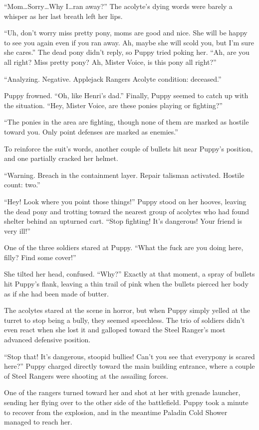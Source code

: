 ``Mom\dots Sorry\dots Why I\dots ran away?'' The acolyte's dying words were barely a whisper as her last breath left her lips.

``Uh, don't worry miss pretty pony, moms are good and nice. She will be happy to see you again even if you ran away. Ah, maybe she will scold you, but I'm sure she cares.'' The dead pony didn't reply, so Puppy tried poking her. ``Ah, are you all right? Miss pretty pony? Ah, Mister Voice, is this pony all right?''

{\mt ``Analyzing. Negative. Applejack Rangers Acolyte condition: deceased.''}

Puppy frowned. ``Oh, like Henri's dad.'' Finally, Puppy seemed to catch up with the situation. ``Hey, Mister Voice, are these ponies playing or fighting?''

{\mt ``The ponies in the area are fighting, though none of them are marked as hostile toward you. Only point defenses are marked as enemies.''}

To reinforce the suit's words, another couple of bullets hit near Puppy's position, and one partially cracked her helmet.

{\mt ``Warning. Breach in the containment layer. Repair talisman activated. Hostile count: two.''}

``Hey! Look where you point those things!'' Puppy stood on her hooves, leaving the dead pony and trotting toward the nearest group of acolytes who had found shelter behind an upturned cart. ``Stop fighting! It's dangerous! Your friend is very ill!''

One of the three soldiers stared at Puppy. ``What the fuck are you doing here, filly? Find some cover!''

She tilted her head, confused. ``Why?'' Exactly at that moment, a spray of bullets hit Puppy's flank, leaving a thin trail of pink when the bullets pierced her body as if she had been made of butter.

The acolytes stared at the scene in horror, but when Puppy simply yelled at the turret to stop being a bully, they seemed speechless. The trio of soldiers didn't even react when she lost it and galloped toward the Steel Ranger's most advanced defensive position.

``Stop that! It's dangerous, stoopid bullies! Can't you see that everypony is scared here?'' Puppy charged directly toward the main building entrance, where a couple of Steel Rangers were shooting at the assailing forces.

One of the rangers turned toward her and shot at her with grenade launcher, sending her flying over to the other side of the battlefield. Puppy took a minute to recover from the explosion, and in the meantime Paladin Cold Shower managed to reach her.

